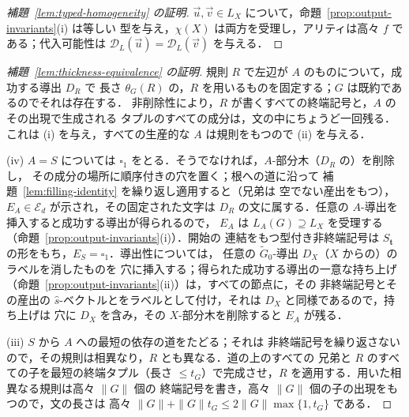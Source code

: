 \documentclass[11pt,a4paper]{ltjsarticle}
\numberwithin{equation}{section}
\theoremstyle{plain}
\theoremstyle{definition}
\theoremstyle{remark}
\newcommand{\D}{\mathcal{D}}
\newcommand{\tuple}[1]{\vec{#1}}
\newcommand{\blank}{\square}
\theoremstyle{plain}
\begin{document}
\begin{proof}[補題~\ref{lem:typed-homogeneity} の証明]
$\tuple u,\tuple v\in L_X$ について，命題~\ref{prop:output-invariants}(i) は等しい
型を与え，$\chi(X)$ は両方を受理し，アリティは高々 $f$ である；代入可能性は
$\D_L(\tuple u)=\D_L(\tuple v)$ を与える．
\end{proof}

\begin{proof}[補題~\ref{lem:thickness-equivalence} の証明]
規則 $R$ で左辺が $A$ のものについて，成功する導出 $D_R$ で
長さ $\theta_G(R)$ の，$R$ を用いるものを固定する；$G$ は既約であるのでそれは存在する．
非削除性により，$R$ が書くすべての終端記号と，$A$ のその出現で生成される
タプルのすべての成分は，文の中にちょうど一回残る．これは
(i) を与え，すべての生産的な $A$ は規則をもつので (ii) を与える．

(iv) $A=S$ については $\blank_1$ をとる．そうでなければ，$A$-部分木（$D_R$ の）を削除し，
その成分の場所に順序付きの穴を置く；根への道に沿って
補題~\ref{lem:filling-identity} を繰り返し適用すると（兄弟は
空でない産出をもつ），$E_A\in\mathcal E_d$ が示され，その固定された文字は
$D_R$ の文に属する．任意の $A$-導出を挿入すると成功する導出が得られるので，
$E_A$ は $L_A(G)\supseteq L_X$ を受理する
（命題~\ref{prop:output-invariants}(i)）．開始の
連結をもつ型付き非終端記号は $S_{\mathbf t}$ の形をもち，$E_S=\blank_1$．導出性については，
任意の $\widetilde G_0$-導出 $D_X$（$X$ からの）のラベルを消したものを
穴に挿入する；得られた成功する導出の一意な持ち上げ
（命題~\ref{prop:output-invariants}(ii)）は，すべての節点に，その
非終端記号とその産出の $\widehat s$-ベクトルとをラベルとして付け，それは $D_X$ と同様であるので，持ち上げは
穴に $D_X$ を含み，その $X$-部分木を削除すると $E_A$ が残る．

(iii) $S$ から $A$ への最短の依存の道をたどる；それは
非終端記号を繰り返さないので，その規則は相異なり，$R$ とも異なる．道の上のすべての
兄弟と $R$ のすべての子を最短の終端タプル（長さ
$\le t_G$）で完成させ，$R$ を適用する．用いた相異なる規則は高々 $\|G\|$ 個の
終端記号を書き，高々 $\|G\|$ 個の子の出現をもつので，文の長さは
高々 $\|G\|+\|G\|t_G\le2\|G\|\max\{1,t_G\}$ である．
\end{proof}
\end{document}
